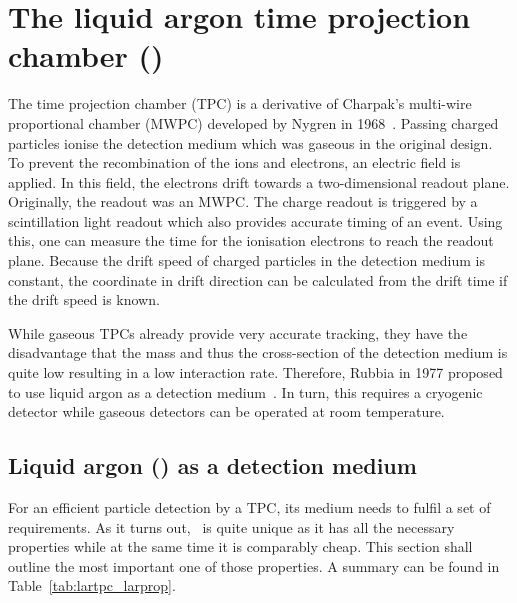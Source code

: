 \chapter{The liquid argon time projection chamber (\lartpc)\label{chap:lartpc}}

The time projection chamber (TPC) is a derivative of Charpak's multi-wire proportional chamber (MWPC)\cite{mwpc} developed by Nygren in 1968~\cite{sauce}.
Passing charged particles ionise the detection medium which was gaseous in the original design.
To prevent the recombination of the ions and electrons, an electric field is applied.
In this field, the electrons drift towards a two-dimensional readout plane.
Originally, the readout was an MWPC.
The charge readout is triggered by a scintillation light readout which also provides accurate timing of an event.
Using this, one can measure the time for the ionisation electrons to reach the readout plane.
Because the drift speed of charged particles in the detection medium is constant, the coordinate in drift direction can be calculated from the drift time if the drift speed is known.

While gaseous TPCs already provide very accurate tracking, they have the disadvantage that the mass and thus the cross-section of the detection medium is quite low resulting in a low interaction rate.
Therefore, Rubbia in 1977 proposed to use liquid argon as a detection medium~\cite{lartpc}.
In turn, this requires a cryogenic detector while gaseous detectors can be operated at room temperature.


\section{Liquid argon (\lar) as a detection medium\label{sec:lartpc_lar}}

For an efficient particle detection by a TPC, its medium needs to fulfil a set of requirements.
As it turns out, \lar\ is quite unique as it has all the necessary properties while at the same time it is comparably cheap.
This section shall outline the most important one of those properties.
A summary can be found in Table~\ref{tab:lartpc_larprop}.

